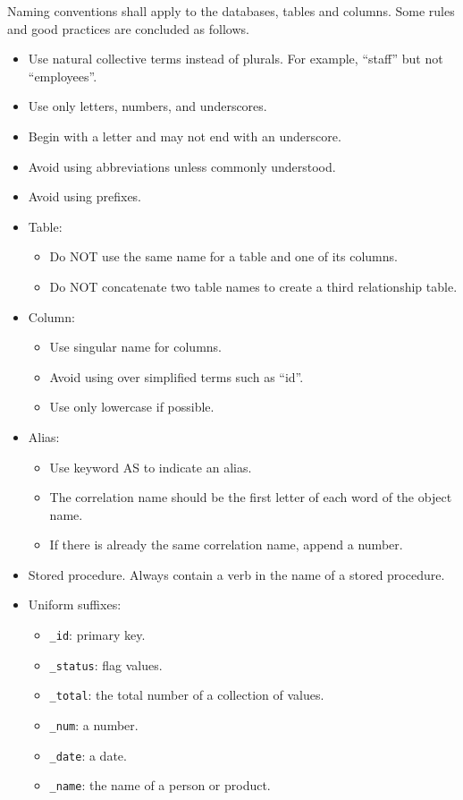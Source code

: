 Naming conventions shall apply to the databases, tables and columns. Some rules and good practices are concluded as follows.
\begin{itemize}
\item Use natural collective terms instead of plurals. For example, ``staff'' but not ``employees''.
\item Use only letters, numbers, and underscores.
\item Begin with a letter and may not end with an underscore.
\item Avoid using abbreviations unless commonly understood.
\item Avoid using prefixes.
\item Table:
\begin{itemize}
	\item Do NOT use the same name for a table and one of its columns.
	\item Do NOT concatenate two table names to create a third relationship table.
\end{itemize}
\item Column:
\begin{itemize}
	\item Use singular name for columns.
	\item Avoid using over simplified terms such as ``id''.
	\item Use only lowercase if possible.
\end{itemize}
\item Alias:
\begin{itemize}
	\item Use keyword AS to indicate an alias.
	\item The correlation name should be the first letter of each word of the object name.
	\item If there is already the same correlation name, append a number.
\end{itemize}
\item Stored procedure. Always contain a verb in the name of a stored procedure.
\item Uniform suffixes:
\begin{itemize}
	\item \verb|_id|: primary key.
	\item \verb|_status|: flag values.
	\item \verb|_total|: the total number of a collection of values.
	\item \verb|_num|: a number.
	\item \verb|_date|: a date.
	\item \verb|_name|: the name of a person or product.
\end{itemize}
\end{itemize}


